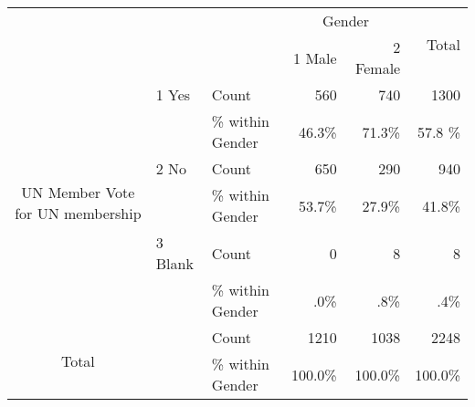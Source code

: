 \documentclass[12pt, a4paper]{article}
\begin{document}
\begin{tabular}{|c|ll|r|r|r|}
	\hline
	\multicolumn{3}{|c|}{\multirow{1}{*}{}} & \multicolumn{2}{c|}{Gender}& \multirow{2}{*}{Total} \\
	\cline{4-5}
	\multicolumn{3}{|c|}{\multirow{1}{*}{}} & 1 Male & 2 Female & \\
	\hline
	\multirow{6}{*}{\parbox{4cm}{UN Member Vote for UN membership}} & 1 Yes & Count & 560 & 740 & 1300 \\
	&& \% within Gender & 46.3\% & 71.3\% & 57.8 \%\\
	\cline{2-6}
	& 2 No & Count & 650 & 290 & 940 \\
	&& \% within Gender & 53.7\% & 27.9\% & 41.8\% \\
	\cline{2-6}
	& 3 Blank & Count & 0 & 8 & 8 \\
	&& \% within Gender & .0\% & .8\% & .4\% \\
	\hline
	\multirow{2}{*}{Total} & & Count & 1210 & 1038 & 2248 \\
	&& \% within Gender & 100.0\% & 100.0\% & 100.0\% \\
	\hline
\end{tabular}
\end{document}
